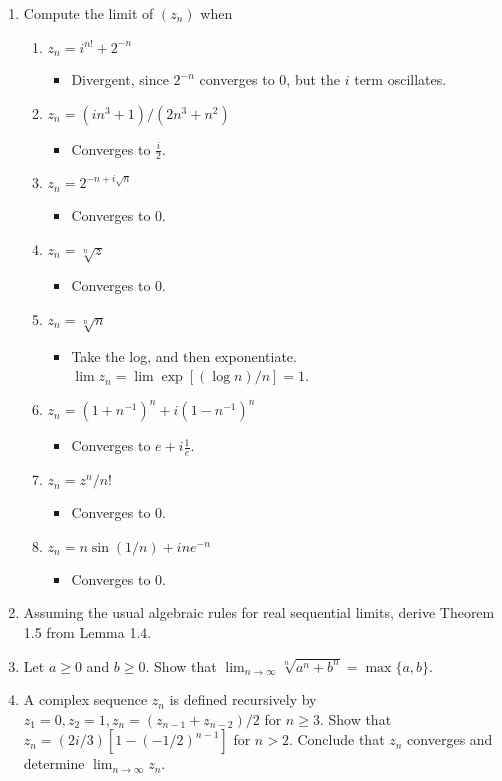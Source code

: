 \documentclass[12pt,a4paper]{article}
\begin{document}
\begin{enumerate}[label={\bfseries II.5.\arabic*}]
	\item Compute the limit of $(z_n)$ when
	\begin{enumerate}[label=(\roman*)]
		\item $z_n = i^{n!} + 2^{-n}$
			\begin{itemize}
				\item[] Divergent, since $2^{-n}$ converges to 0, but the $i$ term oscillates.
			\end{itemize}
		\item $z_n = (in^3 + 1)/(2n^3+n^2)$
			\begin{itemize}
				\item[] Converges to $\frac{i}{2}$.
			\end{itemize}
		\item $z_n = 2^{-n + i\sqrt{n}}$
			\begin{itemize}
				\item[] Converges to 0.
			\end{itemize}
		\item $z_n = \sqrt[n]{z}$
			\begin{itemize}
				\item[] Converges to 0.
			\end{itemize}
		\item $z_n = \sqrt[n]{n}$
			\begin{itemize}
				\item[] Take the log, and then exponentiate. $\lim z_n = \lim \exp [(\log n)/n]=1$. 
			\end{itemize}
		\item $z_n = (1+n^{-1})^n + i(1-n^{-1})^n$
			\begin{itemize}
				\item[] Converges to $e + i\frac{1}{e}$.
			\end{itemize}
		\item $z_n = z^n/n!$
			\begin{itemize}
				\item[] Converges to 0.
			\end{itemize}
		\item $z_n = n\sin(1/n) + ine^{-n}$
			\begin{itemize}
				\item[] Converges to 0.
			\end{itemize}
	\end{enumerate}

\item Assuming the usual algebraic rules for real sequential limits, derive Theorem 1.5 from Lemma 1.4.

\item Let $a \geq 0$ and $b \geq 0$. Show that $\lim_{n\to\infty} \sqrt[n]{a^n + b^n} = \max\{a,b\}$.

\item A complex sequence $z_n$ is defined recursively by $z_1 = 0, z_2 = 1, z_n = (z_{n-1}+z_{n-2})/2$
for $n \geq 3$. Show that $z_n = (2i/3)[1-(-1/2)^{n-1}]$ for $n > 2$. Conclude that $z_n$ converges and
determine $\lim_{n\to\infty} z_n$.

\end{enumerate}
\end{document}
